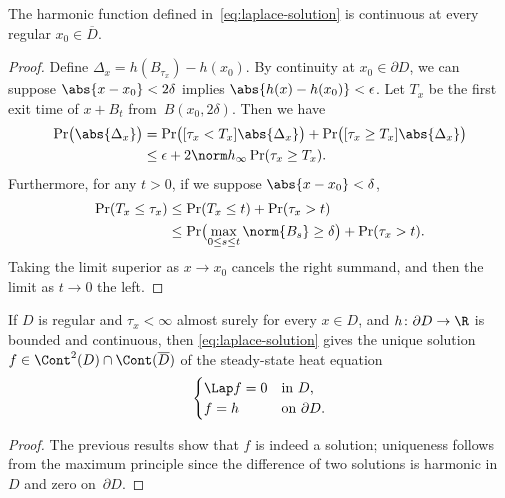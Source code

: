 \begin	{theorem}
The harmonic function defined in~\eqref{eq:laplace-solution}
is continuous at every regular \( x_0 \in \overline D \).
\end	{theorem}
\begin	{proof}
Define \( \Delta_x = h(B_{\tau_x}) - h(x_0) \).
By continuity at \( x_0 \in \partial D \),
we can suppose
\( \abs{x-x_0} < 2\delta \) implies \( \abs{h(x) - h(x_0)} < \epsilon \).
Let $T_x$ be the first exit time of \( x + B_t \) from~$B(x_0,2\delta)$.
Then we have
\begin	{align*}
\Pr\bigl(\abs{\Delta_x}\bigr)
&=	\Pr\bigl( [\tau_x <   T_x] \abs{\Delta_x} \bigr)
+	\Pr\bigl( [\tau_x \ge T_x] \abs{\Delta_x} \bigr) \\
&\le	\epsilon
+	2\norm h_\infty \Pr(\tau_x \ge T_x)
\text.
\end	{align*}
Furthermore, for any \( t > 0 \), if we suppose \( \abs{x-x_0} < \delta \),
\begin	{align*}
\Pr(T_x \le \tau_x)
&\le	\Pr(T_x \le t) + \Pr(\tau_x > t) \\
&\le	\Pr\bigl(\max_{0 \le s \le t} \norm{B_s} \ge \delta\bigr)
+	\Pr(\tau_x > t)
\text.
\end	{align*}
Taking the limit superior as \( x \to x_0 \) cancels the right summand,
and then the limit as \( t \to 0 \) the left.
\end	{proof}

\begin	{theorem}
If $D$ is regular and \( \tau_x < \infty \) almost surely
for every \( x \in D \),
and \( h \colon \partial D \to \R \) is bounded and continuous,
then \eqref{eq:laplace-solution} gives the unique solution
\( f \in \Cont^2(D) \cap \Cont(\overline D) \)
of the steady-state heat equation
\begin	{equation}
\label	{eq:heat-equation}
	\begin	{cases}
	\Lap f = 0  &\text{in~$D$,} \\
	f = h	    &\text{on~$\partial D$.}
	\end	{cases}
\end	{equation}
\end	{theorem}
\begin	{proof}
The previous results show that $f$ is indeed a solution;
uniqueness follows from the maximum principle
since the difference of two solutions is harmonic in~$D$
and zero on~$\partial D$.
\end	{proof}
